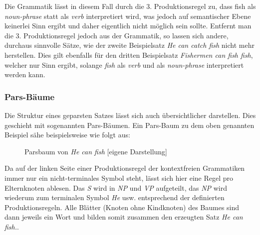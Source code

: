 \documentclass[12pt]{report}
\begin{document}
Die Grammatik lässt in diesem Fall durch die 3. Produktionsregel zu, dass \glqq  fish\grqq{} als \textit{noun-phrase} statt als \textit{verb} interpretiert wird, was jedoch auf semantischer Ebene keinerlei Sinn ergibt und daher eigentlich nicht möglich sein sollte. Entfernt man die 3. Produktionsregel jedoch aus der Grammatik, so lassen sich andere, durchaus sinnvolle Sätze, wie der zweite Beispielsatz \textit{\glqq  He can catch fish\grqq{}} nicht mehr herstellen. Dies gilt ebenfalls für den dritten Beispielsatz \textit{\glqq  Fishermen can fish fish\grqq{}}, welcher nur Sinn ergibt, solange \textit{\glqq  fish\grqq{}} als \textit{verb} und als \textit{noun-phrase} interpretiert werden kann.

\subsubsection{Pars-Bäume}
Die Struktur eines geparsten Satzes lässt sich auch übersichtlicher darstellen. Dies geschieht mit sogenannten Pars-Bäumen. Ein Pars-Baum zu dem oben genannten Beispiel sähe beispielsweise wie folgt aus:
\begin{figure}[h!]
\begin{center}
\caption{Parsbaum von \textit{\glqq  He can fish\grqq{}} [eigene Darstellung]}
\end{center}
\end{figure}

Da auf der linken Seite einer Produktionsregel der kontextfreien Grammatiken immer nur ein nicht-terminales Symbol steht, lässt sich hier eine Regel pro Elternknoten ablesen. Das \textit{S} wird in \textit{NP} und \textit{VP} aufgeteilt, das \textit{NP} wird wiederum zum terminalen Symbol \textit{\glqq  He\grqq{}} usw. entsprechend der definierten Produktionsregeln. Alle Blätter (Knoten ohne Kindknoten) des Baumes sind dann jeweils ein Wort und bilden somit zusammen den erzeugten Satz \textit{\glqq  He can fish.\grqq{}}. 
\end{document}
